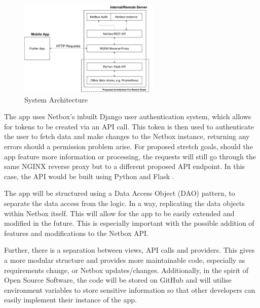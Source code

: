 \documentclass [11pt,a4paper]{article}
\begin{document}
\begin{figure}[H]
    \centering
    \includegraphics[width=0.6\textwidth]{images/top-level-archi.png}
    \caption{System Architecture}
    \label{fig:architecture}
\end{figure}

The app uses Netbox's inbuilt Django user authentication system, which allows for tokens to be created via an API call. This token is then used to authenticate the user to fetch data and make changes to the Netbox instance, returning any errors should a permission problem arise. For proposed stretch goals, should the app feature more information or processing, the requests will still go through the same NGINX reverse proxy but to a different proposed API endpoint. In this case, the API would be built using Python and Flask \cite{flask}. 

The app will be structured using a Data Access Object (DAO) pattern\cite{dao}, to separate the data access from the logic. In a way, replicating the data objects within Netbox itself. This will allow for the app to be easily extended and modified in the future. This is especially important with the possible addition of features and modifications to the Netbox API.

Further, there is a separation between views, API calls and providers. This gives a more modular structure and provides more maintainable code, especially as requirements change, or Netbox updates/changes. Additionally, in the spirit of Open Source Software, the code will be stored on GitHub \cite{keeptrackgithub} and will utilise environment variables to store sensitive information so that other developers can easily implement their instance of the app.
\end{document}
